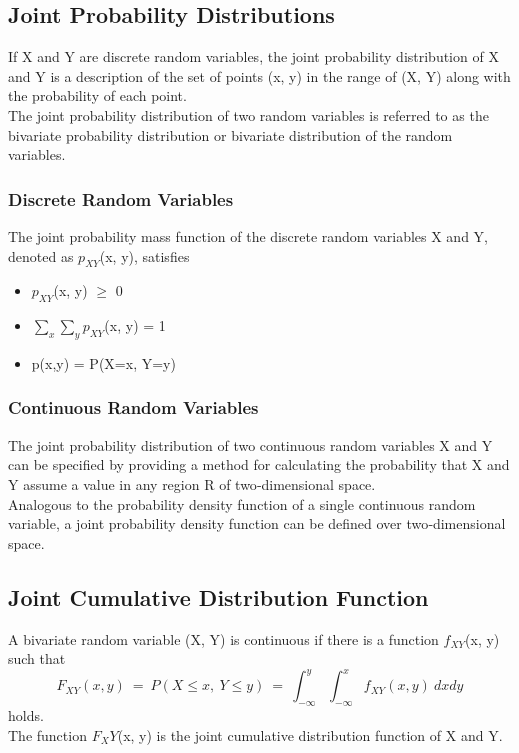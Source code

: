 \subsection*{Joint Probability Distributions}
If X and Y are discrete random variables, the joint probability
distribution of X and Y is a description of the set of points (x, y) in the
range of (X, Y) along with the probability of each point.\\
The joint probability distribution of two random variables is referred
to as the bivariate probability distribution or bivariate distribution of
the random variables.
\subsubsection*{Discrete Random Variables}
The joint probability mass function of the discrete random variables
X and Y, denoted as $p_{XY}$(x, y), satisfies
\begin{itemize}
    \item $p_{XY}$(x, y) $\geq$ 0
    \item $\sum_{x}\sum_{y}p_{XY}$(x, y) = 1
    \item p(x,y) = P(X=x, Y=y)
\end{itemize}
\subsubsection*{Continuous Random Variables}
The joint probability distribution of two continuous random
variables X and Y can be specified by providing a method for
calculating the probability that X and Y assume a value in any region
R of two‐dimensional space.\\
Analogous to the probability density function of a single continuous
random variable, a joint probability density function can be defined
over two‐dimensional space.
\subsection*{Joint Cumulative Distribution Function}
A bivariate random variable (X, Y) is continuous if there is a function
$f_{XY}$(x, y) such that
\[ F_{XY}(x,y)\ =\ P(X\leq x,\ Y\leq y)\ =\ \int_{-\infty}^{y}\int_{-\infty}^{x}f_{XY}(x,y)\ dxdy \]
holds.\\
The function $F_XY$(x, y) is the joint cumulative distribution function of
X and Y.

